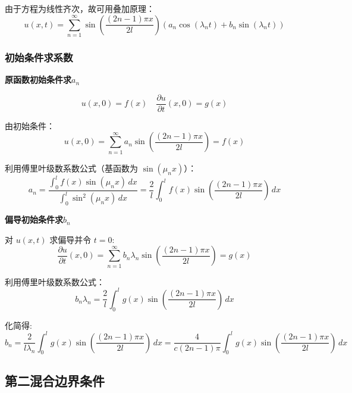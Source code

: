 \documentclass[a4paper, 12pt, oneside]{article} %
\numberwithin{subsection}{section}
\numberwithin{subsubsection}{subsection}
\theoremstyle{plain}
\theoremstyle{definition}
\theoremstyle{remark}
\begin{document}
		由于方程为线性齐次，故可用叠加原理：
		\begin{equation}
			u(x, t) = \sum_{n=1}^{\infty} \sin\left(\frac{(2n-1)\pi x}{2l}\right) \left( a_n \cos(\lambda_n t) + b_n \sin(\lambda_n t) \right)
		\end{equation}
		
		\subsubsection{初始条件求系数}
		\noindent
		\textbf{原函数初始条件求$a_n$}
		
		\begin{equation}
			u(x, 0) = f(x) \quad \frac{\partial u}{\partial t}(x, 0) = g(x)
		\end{equation}
		
		由初始条件：
		\begin{equation}
			u(x, 0) = \sum_{n=1}^{\infty} a_n \sin\left(\frac{(2n-1)\pi x}{2l}\right) = f(x)
		\end{equation}
		
		利用傅里叶级数系数公式（基函数为 $\sin(\mu_n x)$）：
		\begin{equation}
			a_n = \frac{\int_0^l f(x) \sin(\mu_n x) \, dx}{\int_0^l \sin^2(\mu_n x) \, dx} = \frac{2}{l} \int_0^l f(x) \sin\left(\frac{(2n-1)\pi x}{2l}\right) \, dx
		\end{equation}
		
		\noindent
		\textbf{偏导初始条件求$b_n$}
		
		对 $u(x,t)$ 求偏导并令 $t=0$:
		\begin{equation}
			\frac{\partial u}{\partial t}(x, 0) = \sum_{n=1}^{\infty} b_n \lambda_n \sin\left(\frac{(2n-1)\pi x}{2l}\right) = g(x)
		\end{equation}
		
		利用傅里叶级数系数公式：
		\begin{equation}
			b_n \lambda_n = \frac{2}{l} \int_0^l g(x) \sin\left(\frac{(2n-1)\pi x}{2l}\right) \, dx
		\end{equation}
		
		化简得:
		\begin{equation}
			b_n = \frac{2}{l \lambda_n} \int_0^l g(x) \sin\left(\frac{(2n-1)\pi x}{2l}\right) \, dx = \frac{4}{c(2n-1)\pi} \int_0^l g(x) \sin\left(\frac{(2n-1)\pi x}{2l}\right) \, dx
		\end{equation}
		
		\subsection{第二混合边界条件}
		
\end{document}

